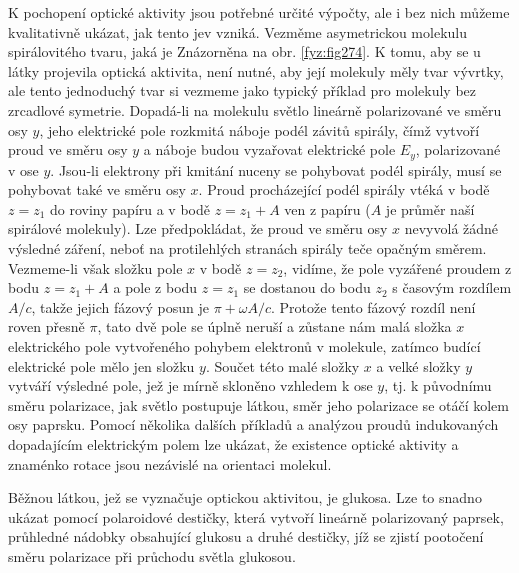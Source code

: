     K pochopení optické aktivity jsou potřebné určité výpočty, ale i bez nich můžeme kvalitativně
    ukázat, jak tento jev vzniká. Vezměme asymetrickou molekulu spirálovitého tvaru, jaká je
    Znázorněna na obr. \ref{fyz:fig274}. K tomu, aby se u látky projevila optická aktivita, není
    nutné, aby její molekuly měly tvar vývrtky, ale tento jednoduchý tvar si vezmeme jako typický
    příklad pro molekuly bez zrcadlové symetrie. Dopadá-li na molekulu světlo lineárně polarizované
    ve směru osy \(y\), jeho elektrické pole rozkmitá náboje podél závitů spirály, čímž vytvoří
    proud ve směru osy \(y\) a náboje budou vyzařovat elektrické pole \(E_y\), polarizované v ose
    \(y\). Jsou-li elektrony při kmitání nuceny se pohybovat podél spirály, musí se pohybovat také
    ve směru osy \(x\). Proud procházející podél spirály vtéká v bodě \(z=z_1\) do roviny papíru a v
    bodě \(z=z_1 + A\) ven z papíru (\(A\) je průměr naší spirálové molekuly). Lze předpokládat, že
    proud ve směru osy \(x\) nevyvolá žádné výsledné záření, neboť na protilehlých stranách spirály
    teče opačným směrem. Vezmeme-li však složku pole \(x\) v bodě \(z=z_2\), vidíme, že pole
    vyzářené proudem z bodu \(z=z_1 + A\) a pole z bodu \(z=z_1\) se dostanou do bodu \(z_2\) s
    časovým rozdílem \(A/c\), takže jejich fázový posun je \(\pi + \omega A/c\). Protože tento
    fázový rozdíl není roven přesně \(\pi\), tato dvě pole se úplně neruší a zůstane nám malá složka
    \(x\) elektrického pole vytvořeného pohybem elektronů v molekule, zatímco budící elektrické pole
    mělo jen složku \(y\). Součet této malé složky \(x\) a velké složky \(y\) vytváří výsledné pole,
    jež je mírně skloněno vzhledem k ose \(y\), tj. k původnímu směru polarizace, jak světlo
    postupuje látkou, směr jeho polarizace se otáčí kolem osy paprsku. Pomocí několika dalších
    příkladů a analýzou proudů indukovaných dopadajícím elektrickým polem lze ukázat, že existence
    optické aktivity a znaménko rotace jsou nezávislé na orientaci molekul.

    Běžnou látkou, jež se vyznačuje optickou aktivitou, je glukosa. Lze to snadno ukázat pomocí
    polaroidové destičky, která vytvoří lineárně polarizovaný paprsek, průhledné nádobky obsahující
    glukosu a druhé destičky, jíž se zjistí pootočení směru polarizace při průchodu světla glukosou.

